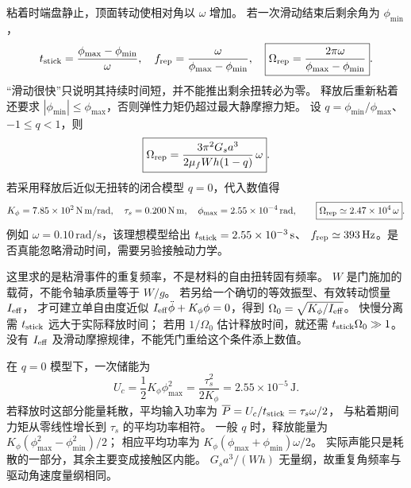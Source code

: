\begin{xesolution}
粘着时端盘静止，顶面转动使相对角以 $\omega$ 增加。
若一次滑动结束后剩余角为 $\phi_{\min}$，
\[
 t_{\rm stick}=\frac{\phi_{\max}-\phi_{\min}}{\omega},\quad
 f_{\rm rep}=\frac{\omega}{\phi_{\max}-\phi_{\min}},\quad
 \boxed{\Omega_{\rm rep}=\frac{2\pi\omega}{\phi_{\max}-\phi_{\min}}}.
\]
“滑动很快”只说明其持续时间短，并不能推出剩余扭转必为零。
释放后重新粘着还要求 $|\phi_{\min}|\le\phi_{\max}$，否则弹性力矩仍超过最大静摩擦力矩。
设 $q=\phi_{\min}/\phi_{\max}$、$-1\le q<1$，则
\[
 \boxed{\Omega_{\rm rep}=\frac{3\pi^2G_sa^3}{2\mu_fWh(1-q)}\,\omega}.
\]
若采用释放后近似无扭转的闭合模型 $q=0$，代入数值得
\[
 K_\phi=7.85\times10^2\,\mathrm{N\,m/rad},\quad
 \tau_s=0.200\,\mathrm{N\,m},\quad
 \phi_{\max}=2.55\times10^{-4}\,\mathrm{rad},
 \qquad
 \boxed{\Omega_{\rm rep}\simeq2.47\times10^4\,\omega}.
\]
例如 $\omega=0.10\,\mathrm{rad/s}$，该理想模型给出
$t_{\rm stick}=2.55\times10^{-3}\,\mathrm s$、
$f_{\rm rep}\simeq393\,\mathrm{Hz}$。是否真能忽略滑动时间，需要另验接触动力学。

这里求的是粘滑事件的重复频率，不是材料的自由扭转固有频率。
$W$ 是门施加的载荷，不能令轴承质量等于 $W/g$。
若另给一个确切的等效振型、有效转动惯量 $I_{\rm eff}$，
才可建立单自由度近似
$I_{\rm eff}\ddot\phi+K_\phi\phi=0$，得到
$\Omega_0=\sqrt{K_\phi/I_{\rm eff}}$。
快慢分离需 $t_{\rm stick}$ 远大于实际释放时间；
若用 $1/\Omega_0$ 估计释放时间，就还需 $t_{\rm stick}\Omega_0\gg1$。
没有 $I_{\rm eff}$ 及滑动摩擦规律，不能凭门重给这个条件添上数值。

在 $q=0$ 模型下，一次储能为
\[
 U_c=\frac12K_\phi\phi_{\max}^2
 =\frac{\tau_s^2}{2K_\phi}=2.55\times10^{-5}\,\mathrm J.
\]
若释放时这部分能量耗散，平均输入功率为
$\overline P=U_c/t_{\rm stick}=\tau_s\omega/2$，
与粘着期间力矩从零线性增长到 $\tau_s$ 的平均功率相符。
一般 $q$ 时，释放能量为
$K_\phi(\phi_{\max}^2-\phi_{\min}^2)/2$；
相应平均功率为 $K_\phi(\phi_{\max}+\phi_{\min})\omega/2$。
实际声能只是耗散的一部分，其余主要变成接触区内能。
$G_sa^3/(Wh)$ 无量纲，故重复角频率与驱动角速度量纲相同。
\end{xesolution}

\endgroup

\hypersetup{bookmarksdepth=2}
